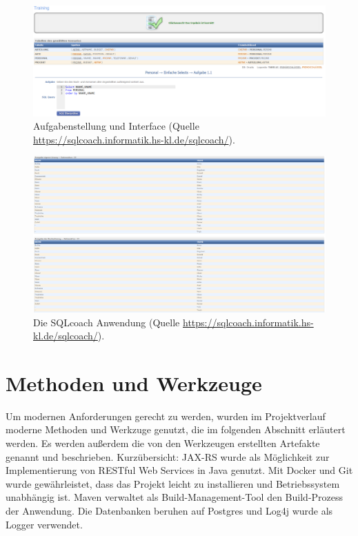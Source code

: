 \documentclass[fleqn,10pt,ngerman]{SelfArx}
\begin{document}
	
		\begin{figure}[ht]\centering
		\includegraphics[width=9 cm]{Abbildungen/SQL_Coach_Aufgabe}
		\caption{Aufgabenstellung und Interface (Quelle \url{https://sqlcoach.informatik.hs-kl.de/sqlcoach/}).}
		\label{fig:fsm2}
	\end{figure}
	\begin{figure}[ht]\centering
		\includegraphics[width=9 cm]{Abbildungen/TabellenBild}
		\caption{Die SQLcoach Anwendung (Quelle \url{https://sqlcoach.informatik.hs-kl.de/sqlcoach/}).}
		\label{fig:fsml3}
	\end{figure}

	
	
	
	
	
	

	\section{Methoden und Werkzeuge}
	\label{sec:methoden}
	Um modernen Anforderungen gerecht zu werden, wurden im Projektverlauf moderne Methoden und Werkzuge genutzt, die im folgenden Abschnitt erläutert werden. Es werden außerdem die von den Werkzeugen erstellten Artefakte genannt und beschrieben.\newline 
	Kurzübersicht:
	JAX-RS wurde als Möglichkeit zur Implementierung von RESTful Web Services in Java genutzt. 
	Mit Docker und Git wurde gewährleistet, dass das Projekt leicht zu installieren und Betriebssystem unabhängig ist.
	Maven verwaltet als Build-Management-Tool den Build-Prozess der Anwendung.
	Die Datenbanken beruhen auf Postgres und Log4j wurde als Logger verwendet.
	
\end{document}
